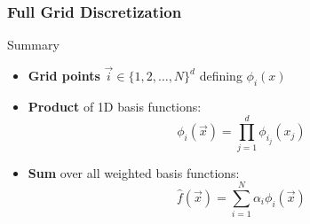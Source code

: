 \begin{frame}
  \frametitle{Full Grid Discretization}
  \topline
  \vspace{-10px}
  \begin{block}{Summary}
    \begin{itemize}
      \item \textbf{Grid points} $\vec{i} \in \{1,2,\dots,N\}^d$ defining $\phi_i(x)$
        \vspace{5px}
        \item \textbf{Product} of 1D basis functions: \\
          $$\phi_i(\vec{x}) = \prod_{j=1}^d{\phi_{i_j}(x_j)}$$
        \item \textbf{Sum} over all weighted basis functions: \\
          $$\hat{f}(\vec{x}) = \sum_{i=1}^N{\alpha_i \phi_i(\vec{x})}$$
    \end{itemize}

  \end{block}
\end{frame}

